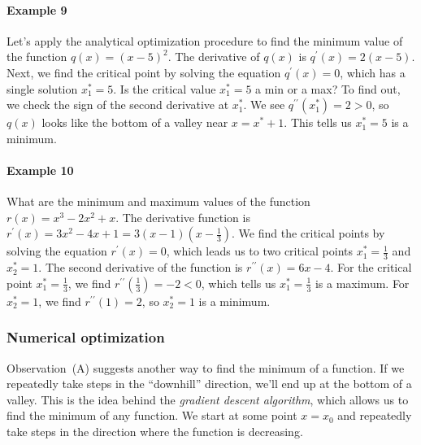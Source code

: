 			\paragraph{Example 9}

				Let's apply the analytical optimization procedure
				to find the minimum value of the function $q(x)=(x-5)^2$.
				The derivative of $q(x)$ is $q^{\prime\!}(x) = 2(x-5)$.
				Next,
				we find the critical point by solving the equation $q^{\prime\!}(x)=0$,
				which has a single solution $x^*_1 = 5$.
				Is the critical value $x^*_1 = 5$ a min or a max?
				To find out,
				we check the sign of the second derivative at $x^*_1$.
				We see $q^{\prime\prime\!}(x^*_1) = 2 > 0$,
				so $q(x)$ looks like the bottom of a valley near $x=x^*+1$.
				This tells us $x^*_1 = 5$ is a minimum.


			\paragraph{Example 10}

				What are the minimum and maximum values of the function $r(x) = x^3-2x^2+x$.
				The derivative function is $r^{\prime\!}(x) = 3x^2 - 4x + 1 = 3(x - 1)(x - \frac{1}{3})$.
				We find the critical points by solving the equation $r^{\prime\!}(x)=0$,
				which leads us to two critical points $x^*_1 = \frac{1}{3}$ and $x^*_2 = 1$.
				The second derivative of the function is $r^{\prime\prime\!}(x) = 6x -4$.
				For the critical point $x^*_1 = \frac{1}{3}$,
				we find $r^{\prime\prime\!}(\frac{1}{3}) = -2 < 0$,
				which tells us $x^*_1 = \frac{1}{3}$ is a maximum.
				For $x^*_2 = 1$,
				we find $r^{\prime\prime\!}(1) = 2$,
				so $x^*_2=1$ is a minimum.



		\subsubsection{Numerical optimization}

			Observation~(A) suggests another way to find the minimum of a function.
			If we repeatedly take steps in the ``downhill'' direction,
			we'll end up at the bottom of a valley.
			This is the idea behind the \emph{gradient descent algorithm},
			which allows us to find the minimum of any function.
			We start at some point $x=x_0$
			and repeatedly take steps in the direction where the function is decreasing.

